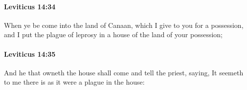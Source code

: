 		\paragraph{Leviticus 14:34} %
			\label{LEVITICUS-14-34}

			When ye be come into the land of Canaan, which I give to you for a possession, and I put the plague of leprosy in a house of the land of your possession;


		\paragraph{Leviticus 14:35} %
			\label{LEVITICUS-14-35}

			And he that owneth the house shall come and tell the priest, saying, It seemeth to me there is as it were a plague in the house:


